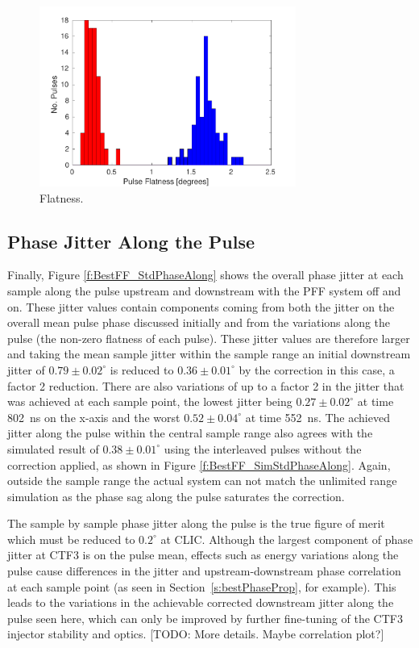 \begin{figure}
  \centering
  \includegraphics[width=0.75\textwidth]{Figures/feedforward/BestFF_Flatness}
  \caption{Flatness.}
  \label{f:BestFF_Flatness}
\end{figure}

\subsection{Phase Jitter Along the Pulse}
\label{ss:bestJitterAlong}

Finally, Figure \ref{f:BestFF_StdPhaseAlong} shows the overall phase jitter at each sample along the pulse upstream and downstream with the PFF system off and on. These jitter values contain components coming from both the jitter on the overall mean pulse phase discussed initially and from the variations along the pulse (the non-zero flatness of each pulse). These jitter values are therefore larger and taking the mean sample jitter within the sample range an initial downstream jitter of \(0.79\pm0.02^\circ\) is reduced to \(0.36\pm0.01^\circ\) by the correction in this case, a factor 2 reduction. There are also variations of up to a factor 2 in the jitter that was achieved at each sample point, the lowest jitter being \(0.27\pm0.02^\circ\) at time 802~ns on the x-axis and the worst \(0.52\pm0.04^\circ\) at time 552~ns. The achieved jitter along the pulse within the central sample range also agrees with the simulated result of \(0.38\pm0.01^\circ\) using the interleaved pulses without the correction applied, as shown in Figure \ref{f:BestFF_SimStdPhaseAlong}. Again, outside the sample range the actual system can not match the unlimited range simulation as the phase sag along the pulse saturates the correction. 

The sample by sample phase jitter along the pulse is the true figure of merit which must be reduced to \(0.2^\circ\) at CLIC. Although the largest component of phase jitter at CTF3 is on the pulse mean, effects such as energy variations along the pulse cause differences in the jitter and upstream-downstream phase correlation at each sample point (as seen in Section~\ref{s:bestPhaseProp}, for example). This leads to the variations in the achievable corrected downstream jitter along the pulse seen here, which can only be improved by further fine-tuning of the CTF3 injector stability and optics. [TODO: More details. Maybe correlation plot?]

